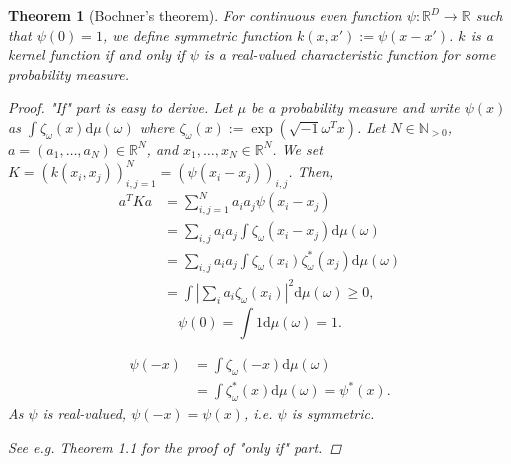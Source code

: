 \documentclass{amsart}
\newtheorem{theorem}{Theorem}[section]
\theoremstyle{definition}
\theoremstyle{remark}
\numberwithin{equation}{section}
\begin{document}
\begin{theorem}[Bochner's theorem]
For continuous even function $\psi:\mathbb{R}^D \to\mathbb{R}$ such that $\psi(0)=1$, we define symmetric function $k(x, x'):=\psi(x-x')$.
$k$ is a kernel function if and only if $\psi$ is a real-valued characteristic function for some probability measure.
\begin{proof}
"If" part is easy to derive.
Let $\mu$ be a probability measure and write $\psi(x)$ as $\int \zeta_\omega(x) \mathrm{d}\mu(\omega)$
where $\zeta_\omega(x) := \exp(\sqrt{-1}\omega^Tx)$.
Let $N\in \mathbb{N}_{>0}$, $a=(a_1, \ldots, a_N)\in \mathbb{R}^N$, and
$x_1, \ldots, x_N\in \mathbb{R}^N$.
We set $K=(k(x_i, x_j))_{i, j=1}^N = (\psi(x_i-x_j))_{i, j}$.
Then,
\begin{equation}
\begin{split}
a^TKa &= \sum_{i, j=1}^{N} a_i a_j \psi(x_i-x_j)\\
      &= \sum_{i, j}a_i a_j \int \zeta_\omega(x_i-x_j)\mathrm{d}\mu(\omega)\\
      &= \sum_{i, j}a_i a_j \int \zeta_\omega(x_i) \zeta_\omega^{\ast}(x_j)\mathrm{d}\mu(\omega)\\
      &= \int \left| \sum_i a_i \zeta_\omega(x_i) \right|^2 \mathrm{d}\mu(\omega)\geq 0,
\end{split}
\end{equation}
\begin{equation}
\psi(0) = \int 1 \mathrm{d}\mu(\omega) = 1.
\end{equation}

\begin{equation}
\begin{split}
\psi(-x) &= \int \zeta_\omega(-x) \mathrm{d}\mu(\omega) \\
         &= \int \zeta_\omega^{\ast}(x) \mathrm{d}\mu(\omega) = \psi^{\ast}(x).
\end{split}
\end{equation}
As $\psi$ is real-valued, $\psi(-x) = \psi(x)$, i.e. $\psi$ is symmetric.

See e.g. \cite{Sun} Theorem 1.1 for the proof of "only if" part.
\end{proof}
\end{theorem}
\end{document}
